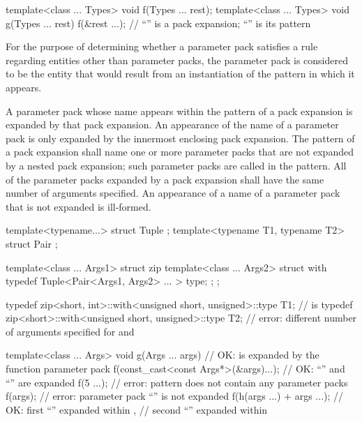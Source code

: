 \begin{example}
\begin{codeblock}
template<class ... Types> void f(Types ... rest);
template<class ... Types> void g(Types ... rest) {
  f(&rest ...);     // ``'' is a pack expansion; ``'' is its pattern
}
\end{codeblock}
\end{example}

\pnum
For the purpose of determining whether a parameter pack satisfies a rule
regarding entities other than parameter packs, the parameter pack is
considered to be the entity that would result from an instantiation of
the pattern in which it appears.

\pnum
A parameter pack whose name appears within the pattern of a pack
expansion is expanded by that pack expansion. An appearance of the name of
a parameter pack is only expanded by the innermost enclosing pack expansion.
The pattern of a pack expansion shall name one or more parameter packs that
are not expanded by a nested pack expansion; such parameter packs are called
 in the pattern. All of the parameter packs expanded
by a pack expansion shall have the same number of arguments specified. An
appearance of a name of a parameter pack that is not expanded is
ill-formed. \begin{example}

\begin{codeblock}
template<typename...> struct Tuple {};
template<typename T1, typename T2> struct Pair {};

template<class ... Args1> struct zip {
  template<class ... Args2> struct with {
    typedef Tuple<Pair<Args1, Args2> ... > type;
  };
};

typedef zip<short, int>::with<unsigned short, unsigned>::type T1;
    //  is 
typedef zip<short>::with<unsigned short, unsigned>::type T2;
    // error: different number of arguments specified for  and 

template<class ... Args>
  void g(Args ... args) {                   // OK:  is expanded by the function parameter pack 
    f(const_cast<const Args*>(&args)...);   // OK: ``'' and ``'' are expanded
    f(5 ...);                               // error: pattern does not contain any parameter packs
    f(args);                                // error: parameter pack ``'' is not expanded
    f(h(args ...) + args ...);              // OK: first ``'' expanded within ,
                                            // second ``'' expanded within 
  }
\end{codeblock}

\end{example}

